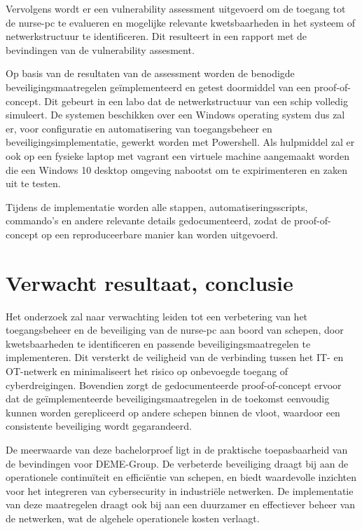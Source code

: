 Vervolgens wordt er een vulnerability assessment uitgevoerd om de toegang tot de nurse-pc te evalueren en mogelijke relevante kwetsbaarheden in het systeem 
of netwerkstructuur te identificeren. Dit resulteert in een rapport met de bevindingen van de vulnerability assesment.

Op basis van de resultaten van de assessment worden de benodigde beveiligingsmaatregelen geïmplementeerd en getest doormiddel van een proof-of-concept. 
Dit gebeurt in een labo dat de netwerkstructuur van een schip volledig simuleert. De systemen beschikken over een Windows operating system dus zal er, voor configuratie en automatisering van toegangsbeheer en beveiligingsimplementatie, gewerkt worden met Powershell. 
Als hulpmiddel zal er ook op een fysieke laptop met vagrant een virtuele machine aangemaakt worden die een Windows 10 desktop omgeving nabootst om te expirimenteren en zaken uit te testen.

Tijdens de implementatie worden alle stappen, automatiseringsscripts, commando's en andere relevante details gedocumenteerd, 
zodat de proof-of-concept op een reproduceerbare manier kan worden uitgevoerd.


\section{Verwacht resultaat, conclusie}%
\label{sec:verwachte_resultaten}
Het onderzoek zal naar verwachting leiden tot een verbetering van het toegangsbeheer en de beveiliging van de nurse-pc aan boord van schepen,
door kwetsbaarheden te identificeren en passende beveiligingsmaatregelen te implementeren. Dit versterkt de veiligheid
van de verbinding tussen het IT- en OT-netwerk en minimaliseert het risico op onbevoegde toegang of cyberdreigingen. 
Bovendien zorgt de gedocumenteerde proof-of-concept ervoor dat de geïmplementeerde beveiligingsmaatregelen in de toekomst eenvoudig kunnen 
worden gerepliceerd op andere schepen binnen de vloot, waardoor een consistente beveiliging wordt gegarandeerd.

De meerwaarde van deze bachelorproef ligt in de praktische toepasbaarheid van de bevindingen voor DEME-Group.
De verbeterde beveiliging draagt bij aan de operationele continuïteit en efficiëntie 
van schepen, en biedt waardevolle inzichten voor het integreren van cybersecurity in industriële netwerken. De implementatie 
van deze maatregelen draagt ook bij aan een duurzamer en effectiever beheer van de netwerken, wat de algehele operationele kosten 
verlaagt.



